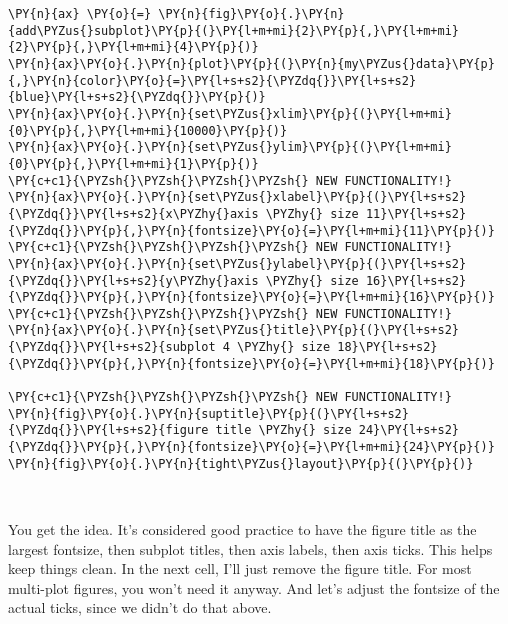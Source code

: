 \begin{tcolorbox}[breakable, size=fbox, boxrule=1pt, pad at break*=1mm,colback=cellbackground, colframe=cellborder]
\begin{Verbatim}[commandchars=\\\{\}]
\PY{n}{ax} \PY{o}{=} \PY{n}{fig}\PY{o}{.}\PY{n}{add\PYZus{}subplot}\PY{p}{(}\PY{l+m+mi}{2}\PY{p}{,}\PY{l+m+mi}{2}\PY{p}{,}\PY{l+m+mi}{4}\PY{p}{)}
\PY{n}{ax}\PY{o}{.}\PY{n}{plot}\PY{p}{(}\PY{n}{my\PYZus{}data}\PY{p}{,}\PY{n}{color}\PY{o}{=}\PY{l+s+s2}{\PYZdq{}}\PY{l+s+s2}{blue}\PY{l+s+s2}{\PYZdq{}}\PY{p}{)}
\PY{n}{ax}\PY{o}{.}\PY{n}{set\PYZus{}xlim}\PY{p}{(}\PY{l+m+mi}{0}\PY{p}{,}\PY{l+m+mi}{10000}\PY{p}{)}
\PY{n}{ax}\PY{o}{.}\PY{n}{set\PYZus{}ylim}\PY{p}{(}\PY{l+m+mi}{0}\PY{p}{,}\PY{l+m+mi}{1}\PY{p}{)}
\PY{c+c1}{\PYZsh{}\PYZsh{}\PYZsh{}\PYZsh{} NEW FUNCTIONALITY!}
\PY{n}{ax}\PY{o}{.}\PY{n}{set\PYZus{}xlabel}\PY{p}{(}\PY{l+s+s2}{\PYZdq{}}\PY{l+s+s2}{x\PYZhy{}axis \PYZhy{} size 11}\PY{l+s+s2}{\PYZdq{}}\PY{p}{,}\PY{n}{fontsize}\PY{o}{=}\PY{l+m+mi}{11}\PY{p}{)}
\PY{c+c1}{\PYZsh{}\PYZsh{}\PYZsh{}\PYZsh{} NEW FUNCTIONALITY!}
\PY{n}{ax}\PY{o}{.}\PY{n}{set\PYZus{}ylabel}\PY{p}{(}\PY{l+s+s2}{\PYZdq{}}\PY{l+s+s2}{y\PYZhy{}axis \PYZhy{} size 16}\PY{l+s+s2}{\PYZdq{}}\PY{p}{,}\PY{n}{fontsize}\PY{o}{=}\PY{l+m+mi}{16}\PY{p}{)}
\PY{c+c1}{\PYZsh{}\PYZsh{}\PYZsh{}\PYZsh{} NEW FUNCTIONALITY!}
\PY{n}{ax}\PY{o}{.}\PY{n}{set\PYZus{}title}\PY{p}{(}\PY{l+s+s2}{\PYZdq{}}\PY{l+s+s2}{subplot 4 \PYZhy{} size 18}\PY{l+s+s2}{\PYZdq{}}\PY{p}{,}\PY{n}{fontsize}\PY{o}{=}\PY{l+m+mi}{18}\PY{p}{)}

\PY{c+c1}{\PYZsh{}\PYZsh{}\PYZsh{}\PYZsh{} NEW FUNCTIONALITY!}
\PY{n}{fig}\PY{o}{.}\PY{n}{suptitle}\PY{p}{(}\PY{l+s+s2}{\PYZdq{}}\PY{l+s+s2}{figure title \PYZhy{} size 24}\PY{l+s+s2}{\PYZdq{}}\PY{p}{,}\PY{n}{fontsize}\PY{o}{=}\PY{l+m+mi}{24}\PY{p}{)}
\PY{n}{fig}\PY{o}{.}\PY{n}{tight\PYZus{}layout}\PY{p}{(}\PY{p}{)}
\end{Verbatim}
\end{tcolorbox}

    \begin{center}
    \end{center}
    { \hspace*{\fill} \\}
    
    You get the idea. It's considered good practice to have the figure title
as the largest fontsize, then subplot titles, then axis labels, then
axis ticks. This helps keep things clean. In the next cell, I'll just
remove the figure title. For most multi-plot figures, you won't need it
anyway. And let's adjust the fontsize of the actual ticks, since we
didn't do that above.

